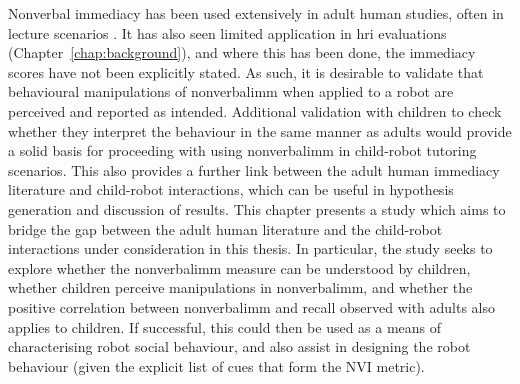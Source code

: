 \newpage
Nonverbal immediacy has been used extensively in adult human studies, often in lecture scenarios \citep{christophel1990relationships, gorham1988relationship, thweatt1998impact}. It has also seen limited application in \acrshort{hri} evaluations (Chapter~\ref{chap:background}), and where this has been done, the \gls{immediacy} scores have not been explicitly stated. As such, it is desirable to validate that behavioural manipulations of \gls{nonverbalimm} when applied to a robot are perceived and reported as intended. Additional validation with children to check whether they interpret the behaviour in the same manner as adults would provide a solid basis for proceeding with using \gls{nonverbalimm} in child-robot tutoring scenarios. This also provides a further link between the adult human \gls{immediacy} literature and child-robot interactions, which can be useful in hypothesis generation and discussion of results. This chapter presents a study which aims to bridge the gap between the adult human literature and the child-robot interactions under consideration in this thesis. In particular, the study seeks to explore whether the \gls{nonverbalimm} measure can be understood by children, whether children perceive manipulations in \gls{nonverbalimm}, and whether the positive correlation between \gls{nonverbalimm} and recall observed with adults also applies to children. If successful, this could then be used as a means of characterising robot social behaviour, and also assist in designing the robot behaviour (given the explicit list of cues that form the NVI metric).

